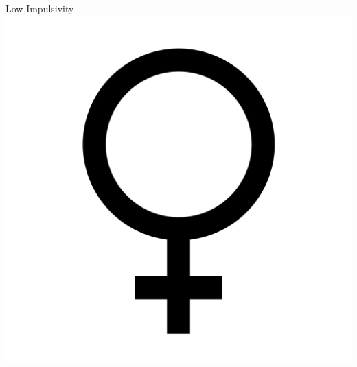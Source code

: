 \documentclass[aspectratio=169]{beamer}
\begin{document}
\begin{frame}
  \begin{center}
    \Huge Low Impulsivity \\
    \includegraphics[scale=.025]{./assets/women.png} \\
    \small \cite{langford93}
  \end{center}
\end{frame}
\end{document}
